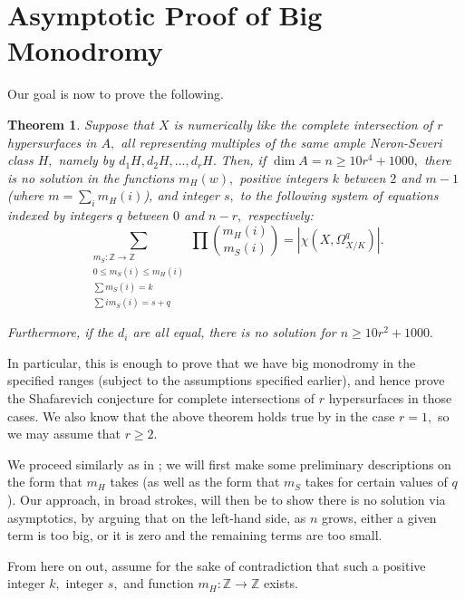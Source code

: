 \documentclass{article}
\newtheorem{thm}{Theorem}[section]
\theoremstyle{definition}
\theoremstyle{remark}
\begin{document}
\section{Asymptotic Proof of Big Monodromy}\label{section: big monodromy asymptotics}
Our goal is now to prove the following.
\begin{thm}\label{thm: big monodromy statement}
Suppose that $X$ is numerically like the complete intersection of $r$ hypersurfaces in $A,$ all representing multiples of the same ample Neron-Severi class $H,$ namely by $d_1H, d_2H, \ldots, d_rH.$ Then, if $\dim A = n \geq 10r^4 + 1000,$ there is no solution in the functions $m_H(w),$ positive integers $k$ between $2$ and $m - 1$ (where $m = \sum\limits_i m_H(i)$), and integer $s,$ to the following system of equations indexed by integers $q$ between $0$ and $n-r,$ respectively:
\[\sum\limits_{\substack{m_S: \mathbb{Z} \rightarrow \mathbb{Z} \\ 0 \leq m_S(i) \leq m_H(i) \\ \sum m_S(i) = k \\ \sum im_S(i) = s + q}} \prod\limits \binom{m_H(i)}{m_S(i)} = |\chi(X, \Omega^q_{X/K})|.\]
\par Furthermore, if the $d_i$ are all equal, there is no solution for $n \geq 10r^2 + 1000.$
\end{thm}
In particular, this is enough to prove that we have big monodromy in the specified ranges (subject to the assumptions specified earlier), and hence prove the Shafarevich conjecture for complete intersections of $r$ hypersurfaces in those cases. We also know that the above theorem holds true by \cite[Proposition B.1]{ls25} in the case $r = 1,$ so we may assume that $r \geq 2.$
\par We proceed similarly as in \cite[Appendix B]{ls25}; we will first make some preliminary descriptions on the form that $m_H$ takes (as well as the form that $m_S$ takes for certain values of $q$). Our approach, in broad strokes, will then be to show there is no solution via asymptotics, by arguing that on the left-hand side, as $n$ grows, either a given term is too big, or it is zero and the remaining terms are too small. 
\par From here on out, assume for the sake of contradiction that such a positive integer $k,$ integer $s,$ and function $m_H: \mathbb{Z} \rightarrow \mathbb{Z}$ exists.
\end{document}

